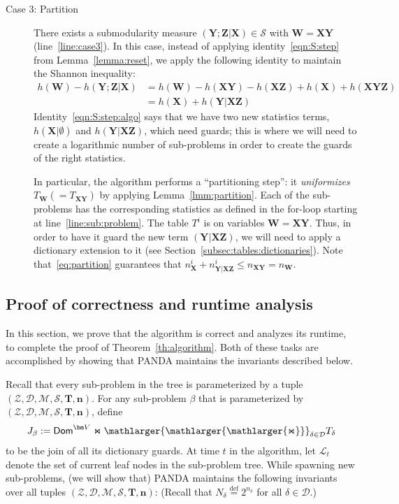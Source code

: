 \documentclass{theoretics}
\newcommand{\dom}{\textsf{Dom}}
\newcommand{\calM}{\mathcal M}
\newcommand{\calS}{\mathcal S}
\newcommand{\calD}{\mathcal D}
\newcommand{\calL}{\mathcal L}
\newcommand{\calZ}{\mathcal Z}
\newcommand{\defeq}{\stackrel{\text{def}}{=}}
\newcommand{\bigjoin}{\mathlarger{\mathlarger{\mathlarger{\Join}}}}
\newcommand{\panda}{\textsf{PANDA}\xspace}
\begin{document}
\begin{description}
  \item[Case 3: Partition]  There exists a submodularity measure $(\bm Y;\bm Z|\bm X) \in \calS$ with
  $\bm W = \bm X\bm Y$ (line~\ref{line:case3}). In this case, instead of applying identity~\eqref{eqn:S:step} from Lemma~\ref{lemma:reset}, we apply the following identity
  to maintain the Shannon inequality:
  \begin{align}
    h(\bm W) -h(\bm Y;\bm Z|\bm X)&=
    h(\bm W) -h(\bm X\bm Y) - h(\bm X\bm Z) + h(\bm X) + h(\bm X \bm Y \bm Z) \nonumber \\
    &= h(\bm X)  + h(\bm Y|\bm X \bm Z)
    \label{eqn:S:step:algo}
  \end{align}
  Identity~\eqref{eqn:S:step:algo} says that we have two new statistics terms, $h(\bm X|\emptyset)$ and
  $h(\bm Y | \bm X \bm Z)$, which need guards; this is where we will need to create a logarithmic
  number of sub-problems in order to create the guards of the right statistics.

  In particular, the algorithm performs a ``partitioning step'': it {\em uniformizes}
  $T_{\bm W} (= T_{\bm X\bm Y})$ by applying Lemma~\ref{lmm:partition}.
  Each of the sub-problems has the corresponding statistics as defined
  in the for-loop starting at line~\ref{line:sub:problem}.
  The table $T^i$ is on variables $\bm W=\bm X\bm Y$. Thus, in order to have it guard
  the new term $(\bm Y|\bm X\bm Z)$, we will need to apply a dictionary extension to it (see Section~\ref{subsec:tables:dictionaries}).
  Note that~\eqref{eq:partition} guarantees that
  $n^i_{\bm X} + n^i_{\bm Y|\bm X\bm Z} \leq n_{\bm X \bm Y} = n_{\bm W}$.
\end{description}

\subsection{Proof of correctness and runtime analysis}
\label{subsec:analysis}

In this section, we prove that the algorithm is correct and analyzes its runtime, to
complete the proof of Theorem~\ref{th:algorithm}.
Both of these tasks are accomplished by showing that \panda maintains the invariants
described below.

Recall that every sub-problem in the tree is parameterized by a tuple
$(\calZ, \calD, \calM, \calS, \bm T, \bm n)$.
For any sub-problem $\beta$ that is parameterized by
$(\calZ, \calD, \calM, \calS, \bm T, \bm n)$, define
\[ J_\beta := \dom^{\bm V} \Join \bigjoin_{\delta \in \calD}T_{\delta} \]
to be the join of all its dictionary guards.
At time $t$ in the algorithm, let $\calL_t$ denote the set of current leaf nodes in the
sub-problem tree.
While spawning new sub-problems, (we will show that)
\panda maintains the following invariants over all tuples $(\calZ, \calD, \calM, \calS, \bm T, \bm n)$: (Recall that $N_\delta \defeq 2^{n_\delta}$ for all $\delta \in \calD$.)
\end{document}
